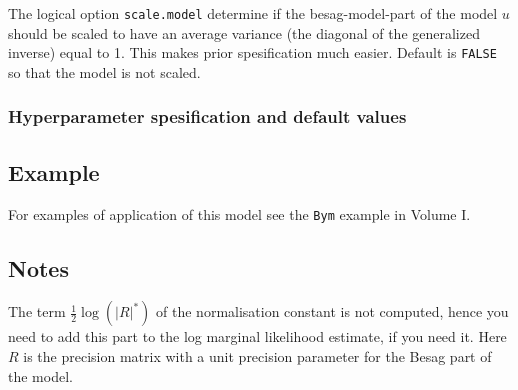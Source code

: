 \documentclass[a4paper,11pt]{article}
\begin{document}
The logical option \verb|scale.model| determine if the
besag-model-part of the model $u$ should be scaled to have an average
variance (the diagonal of the generalized inverse) equal to 1. This
makes prior spesification much easier. Default is \verb|FALSE| so that
the model is not scaled.


\subsubsection*{Hyperparameter spesification and default values}



\subsection*{Example}

For examples of application of this model see the {\tt Bym} example in
Volume I.

\subsection*{Notes}

The term $\frac{1}{2}\log(|R|^{*})$ of the normalisation constant is
not computed, hence you need to add this part to the log marginal
likelihood estimate, if you need it. Here $R$ is the precision matrix
with a unit precision parameter for the Besag part of the model.
\end{document}
